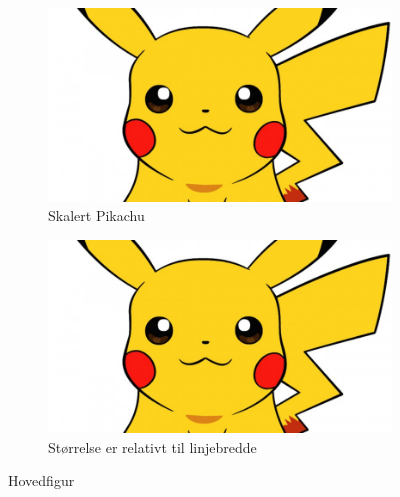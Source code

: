 \begin{figure}[!htb]
    \centering
    \begin{subfigure}{0.45\textwidth}
        \centering
        \includegraphics[scale=0.15]{figurer/pika.jpg}
        \caption{Skalert Pikachu}
        \label{fig:inl_scaled_pika}
    \end{subfigure}
    \begin{subfigure}{0.45\textwidth}
    \centering
        \includegraphics[width=0.9\linewidth]{figurer/pika.jpg}
        \caption{Størrelse er relativt til linjebredde}
        \label{fig:inl_relative_pika}
    \end{subfigure}

    \caption{Hovedfigur}
    \label{fig:inl_subfigs_main}
\end{figure}

